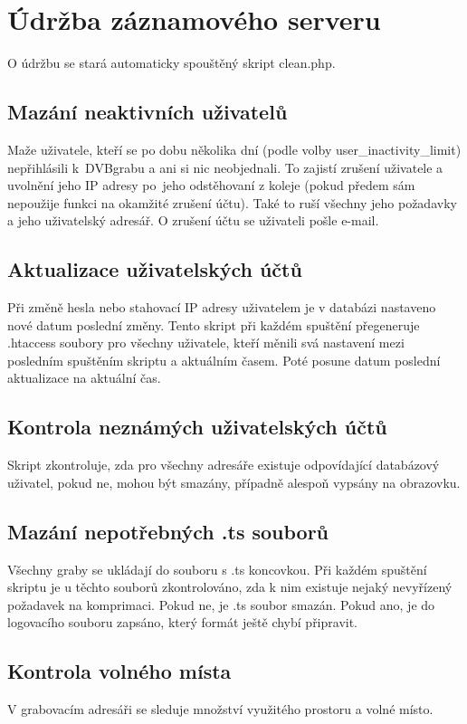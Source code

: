 \section{Údržba záznamového serveru}
O údržbu se stará automaticky spouštěný skript clean.php.

\subsection{Mazání neaktivních uživatelů}
Maže uživatele, kteří se po dobu několika dní (podle volby user\_inactivity\_limit) nepřihlásili \linebreak[4]k~DVBgrabu a ani si nic neobjednali. To zajistí zrušení uživatele a uvolnění jeho IP adresy po~jeho odstěhovaní z koleje (pokud předem sám nepoužije funkci na okamžité zrušení účtu). Také to ruší všechny jeho požadavky a jeho uživatelský adresář. O zrušení účtu se uživateli pošle e-mail.

\subsection{Aktualizace uživatelských účtů}
Při změně hesla nebo stahovací IP adresy uživatelem je v databázi nastaveno nové datum poslední změny. Tento skript při každém spuštění přegeneruje .htaccess soubory pro všechny uživatele, kteří měnili svá nastavení mezi posledním spuštěním skriptu a aktuálním časem. Poté posune datum poslední aktualizace na aktuální čas.

\subsection{Kontrola neznámých uživatelských účtů}
Skript zkontroluje, zda pro všechny adresáře existuje odpovídající databázový uživatel, pokud ne, mohou být smazány, případně alespoň vypsány na obrazovku.
\vfil
\pagebreak
\subsection{Mazání nepotřebných .ts souborů}
Všechny graby se ukládají do souboru s .ts koncovkou. Při každém spuštění skriptu je u těchto souborů zkontrolováno, zda k nim existuje nejaký nevyřízený požadavek na komprimaci. Pokud ne, je .ts soubor smazán. Pokud ano, je do logovacího souboru zapsáno, který formát ještě chybí připravit.

\subsection{Kontrola volného místa}
V grabovacím adresáři se sleduje množství využitého prostoru a volné místo. 

